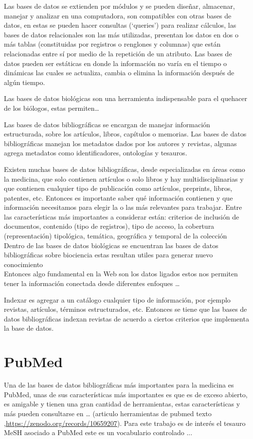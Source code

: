 \documentclass[../Main.tex]{subfiles}
\begin{document}
\smallskip
Las bases de datos se extienden por módulos y se pueden diseñar, almacenar, manejar y analizar en una computadora, son compatibles con otras bases de datos, en estas se pueden hacer consultas (‘queries’) para realizar cálculos, las bases de datos relacionales son las más utilizadas, presentan los datos en dos o más tablas (constituidas por registros o renglones y columnas) que están relacionadas entre sí por medio de la repetición de un atributo.
Las bases de datos pueden ser estáticas en donde la información no varía en el tiempo o dinámicas las cuales se actualiza, cambia o elimina la información después de algún tiempo. 

\smallskip
Las bases de datos biológicas son una herramienta indispensable para el quehacer de los biólogos, estas permiten… 

\smallskip
Las bases de datos bibliográficas se encargan de manejar información estructurada, sobre los artículos, libros, capítulos o memorias. Las bases de datos bibliográficas manejan los metadatos dados por los autores y revistas, algunas agrega metadatos como identificadores, ontologías y tesauros.  

\smallskip
Existen muchas bases de datos bibliográficas, desde especializadas en áreas como la medicina, que solo contienen artículos o solo libros y hay multidisciplinarias y que contienen cualquier tipo de publicación como artículos, preprints, libros, patentes, etc. Entonces es importante saber qué información contienen y que información necesitamos para elegir la o las más relevantes para trabajar. Entre las características más importantes a considerar están: criterios de inclusión de documentos, contenido (tipo de registros), tipo de acceso, la cobertura (representación) tipológica, temática, geográfica y temporal de la colección
Dentro de las bases de datos biológicas se encuentran las bases de datos bibliográficas sobre biociencia estas resultan utiles para generar nuevo conocimiento\\
Entonces algo fundamental en la Web son los datos ligados estos nos permiten tener la información conectada desde diferentes enfoques … 

\smallskip
Indexar es  agregar a un catálogo cualquier tipo de información, por ejemplo revistas, artículos, términos estructurados, etc. Entonces se tiene que las bases de datos bibliográficas indexan revistas de acuerdo a ciertos criterios que implementa la base de datos. 
    
\section{PubMed}
\noindent
Una de las bases de datos bibliográficas más importantes para la medicina es PubMed, unas de sus características más importantes es que es de exceso abierto, es amigable y tienen una gran cantidad de herramientas, estas características y más pueden consultarse en … (articulo herramientas de pubmed texto ,\url{https://zenodo.org/records/10659207}). 
Para este trabajo es de interés el tesauro MeSH asociado a PubMed este es un vocabulario controlado ... 
\end{document}
